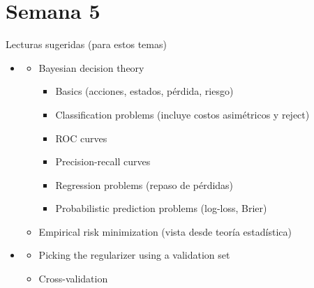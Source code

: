 \part{Semana 5}

\begin{frame}
  \titlepage
\end{frame}

\begin{frame}{Lecturas sugeridas (para estos temas)}
\begin{itemize}
  \item {}
  \begin{itemize}
    \item {} Bayesian decision theory
    \begin{itemize}
      \item {} Basics (acciones, estados, pérdida, riesgo)
      \item {} Classification problems (incluye costos asimétricos y reject)
      \item {} ROC curves
      \item {} Precision-recall curves
      \item {} Regression problems (repaso de pérdidas)
      \item {} Probabilistic prediction problems (log-loss, Brier)
    \end{itemize}
    \item {} Empirical risk minimization (vista desde teoría estadística)
  \end{itemize}
  \item {}
  \begin{itemize}
    \item {} Picking the regularizer using a validation set
    \item {} Cross-validation
  \end{itemize}
\end{itemize}
\end{frame}

